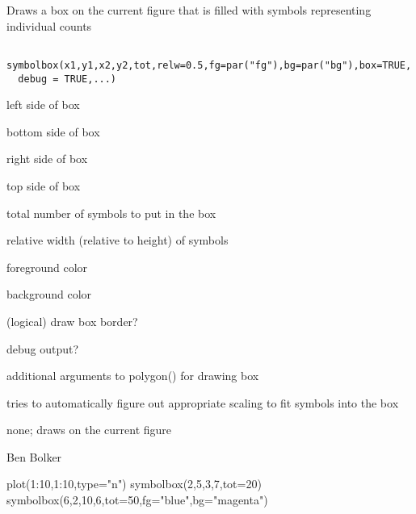 \begin{Description}\relax
Draws a box on the current figure that is filled with symbols
representing individual counts
\end{Description}
\begin{Usage}
\begin{verbatim}
 symbolbox(x1,y1,x2,y2,tot,relw=0.5,fg=par("fg"),bg=par("bg"),box=TRUE,
  debug = TRUE,...)
\end{verbatim}
\end{Usage}
\begin{Arguments}
\begin{ldescription}
\item[\code{x1}] left side of box
\item[\code{y1}] bottom side of box
\item[\code{x2}] right side of box
\item[\code{y2}] top side of box
\item[\code{tot}] total number of symbols to put in the box
\item[\code{relw}] relative width (relative to height) of symbols
\item[\code{fg}] foreground color
\item[\code{bg}] background color
\item[\code{box}] (logical) draw box border?
\item[\code{debug}] debug output?
\item[\code{...}] additional arguments to polygon() for drawing box
\end{ldescription}
\end{Arguments}
\begin{Details}\relax
tries to automatically figure out appropriate scaling to fit symbols
into the box
\end{Details}
\begin{Value}
none; draws on the current figure
\end{Value}
\begin{Author}\relax
Ben Bolker
\end{Author}
\begin{SeeAlso}\relax
{}
\end{SeeAlso}
\begin{Examples}
\begin{ExampleCode}
 plot(1:10,1:10,type="n")
 symbolbox(2,5,3,7,tot=20)
 symbolbox(6,2,10,6,tot=50,fg="blue",bg="magenta")
\end{ExampleCode}
\end{Examples}

